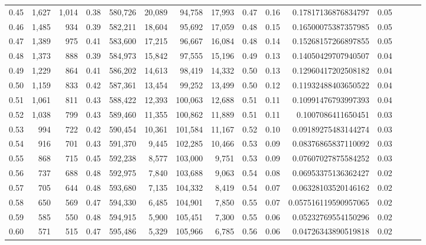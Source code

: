 \begin{tabular}{rrrrrrrrrrrrrrr}
0.45 &   1,627 &  1,014 &  0.38 &  580,726 &   20,089 &   94,758 &   17,993 &  0.47 &  0.16 &     0.17817136876834797 &      0.05 \\
0.46 &   1,485 &    934 &  0.39 &  582,211 &   18,604 &   95,692 &   17,059 &  0.48 &  0.15 &     0.16500075387357985 &      0.05 \\
0.47 &   1,389 &    975 &  0.41 &  583,600 &   17,215 &   96,667 &   16,084 &  0.48 &  0.14 &     0.15268157266897855 &      0.05 \\
0.48 &   1,373 &    888 &  0.39 &  584,973 &   15,842 &   97,555 &   15,196 &  0.49 &  0.13 &     0.14050429707940507 &      0.04 \\
0.49 &   1,229 &    864 &  0.41 &  586,202 &   14,613 &   98,419 &   14,332 &  0.50 &  0.13 &     0.12960417202508182 &      0.04 \\
0.50 &   1,159 &    833 &  0.42 &  587,361 &   13,454 &   99,252 &   13,499 &  0.50 &  0.12 &     0.11932488403650522 &      0.04 \\
0.51 &   1,061 &    811 &  0.43 &  588,422 &   12,393 &  100,063 &   12,688 &  0.51 &  0.11 &     0.10991476793997393 &      0.04 \\
0.52 &   1,038 &    799 &  0.43 &  589,460 &   11,355 &  100,862 &   11,889 &  0.51 &  0.11 &      0.1007086411650451 &      0.03 \\
0.53 &     994 &    722 &  0.42 &  590,454 &   10,361 &  101,584 &   11,167 &  0.52 &  0.10 &     0.09189275483144274 &      0.03 \\
0.54 &     916 &    701 &  0.43 &  591,370 &    9,445 &  102,285 &   10,466 &  0.53 &  0.09 &     0.08376865837110092 &      0.03 \\
0.55 &     868 &    715 &  0.45 &  592,238 &    8,577 &  103,000 &    9,751 &  0.53 &  0.09 &     0.07607027875584252 &      0.03 \\
0.56 &     737 &    688 &  0.48 &  592,975 &    7,840 &  103,688 &    9,063 &  0.54 &  0.08 &     0.06953375136362427 &      0.02 \\
0.57 &     705 &    644 &  0.48 &  593,680 &    7,135 &  104,332 &    8,419 &  0.54 &  0.07 &     0.06328103520146162 &      0.02 \\
0.58 &     650 &    569 &  0.47 &  594,330 &    6,485 &  104,901 &    7,850 &  0.55 &  0.07 &    0.057516119590957065 &      0.02 \\
0.59 &     585 &    550 &  0.48 &  594,915 &    5,900 &  105,451 &    7,300 &  0.55 &  0.06 &     0.05232769554150296 &      0.02 \\
0.60 &     571 &    515 &  0.47 &  595,486 &    5,329 &  105,966 &    6,785 &  0.56 &  0.06 &     0.04726343890519818 &      0.02 \\

\end{tabular}
